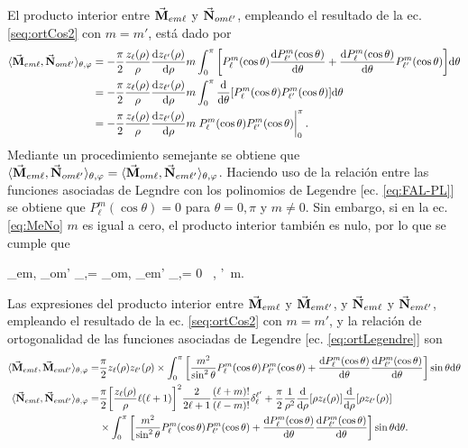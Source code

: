 \documentclass[letterpaper,11pt] {article}
\begin{document}
 El producto interior entre $\va{M}_{em\ell}$ y $\va{N}_{om\ell'}$, empleando el resultado de la ec. \eqref{seq:ortCos2} con $m=m'$, está dado por
	\begin{align}
		\langle\va{M}_{em\ell},  \va{N}_{om\ell'} \rangle_{\theta,\varphi} &= - \frac{\pi}{2} \frac{z_\ell (\rho)}{\rho}\dv{z_{\ell'}(\rho)}{\rho}	m
							 \int_0^\pi\qty[P_\ell^m(\cos \theta )\dv{P_{\ell'}^m(\cos \theta )}{\theta}+ 
							  \dv{P_{\ell}^m(\cos \theta )}{\theta}P_{\ell'}^m(\cos \theta )] \dd\theta \notag\\
					 &=- \frac{\pi}{2} \frac{z_\ell (\rho)}{\rho}\dv{z_{\ell'}(\rho)}{\rho}	m 
					 	\int_0^\pi \dv{\theta}\qty[P_\ell^m(\cos\theta)P_{\ell'}^m(\cos\theta)]\dd\theta \notag\\
					 &=- \frac{\pi}{2} \frac{z_\ell (\rho)}{\rho}\dv{z_{\ell'}(\rho)}{\rho}	m \eval{P_\ell^m(\cos\theta)P_{\ell'}^m(\cos\theta)}_0^\pi.
					 	\label{eq:MeNo}
	\end{align}
Mediante un procedimiento semejante se obtiene que $\langle\va{M}_{em\ell},  \va{N}_{om\ell'} \rangle_{\theta,\varphi}=\langle\va{M}_{om\ell},  \va{N}_{em\ell'} \rangle_{\theta,\varphi}$. Haciendo uso de la relación entre las funciones asociadas de Legndre con los polinomios de Legendre [ec. \eqref{eq:FAL-PL}] se obtiene que $P_\ell^m(\cos\theta)=0$ para $\theta=0,\pi$ y $m\neq 0$. Sin embargo, si en la ec. \eqref{eq:MeNo} $m$ es igual a cero, el producto interior también es nulo, por lo que se cumple que 
	\begin{tcolorbox}
		\langle{}_{em\ell},  _{om\ell'} \rangle_{\theta,\varphi}=
		\langle{}_{om\ell},  _{em\ell'} \rangle_{\theta,\varphi}= 0	
		\qquad \forall\, \ell, \ell'\, m.
	\end{tcolorbox}
Las expresiones del  producto interior entre $\va{M}_{em\ell}$ y $\va{M}_{em\ell'}$, y $\va{N}_{em\ell}$ y $\va{N}_{em\ell'}$, empleando el resultado de la ec. \eqref{seq:ortCos2} con $m=m'$, y la relación de ortogonalidad de las funciones asociadas de Legendre [ec. \eqref{eq:ortLegendre}] son
	\begin{align*}
		\langle\va{M}_{em\ell},  \va{M}_{em\ell'} \rangle_{\theta,\varphi} =& 
				\frac{\pi}{2} z_\ell (\rho) z_{\ell'}(\rho)\times	 \int_0^\pi\qty[\frac{m^2}{\sin^2\theta}P_\ell^m(\cos\theta)P_{\ell'}^m(\cos\theta)
				 +\dv{P_\ell^m(\cos\theta)}{\theta}\dv{P_{\ell'}^m(\cos\theta)}{\theta}]\sin\theta\dd\theta\\
		\langle\va{N}_{em\ell},  \va{N}_{em\ell'} \rangle_{\theta,\varphi} =&
				\frac{\pi}{2} \qty[\frac{z_\ell(\rho)}{\rho}\ell(\ell+1)]^2\frac{2}{2\ell+1}\frac{(\ell+m)!}{(\ell-m)!}\delta_\ell^{\ell'}+
				\frac{\pi}{2} \frac{1}{\rho^2}\dv{\rho}\qty[\rho z_\ell (\rho)]\dv{\rho}\qty[\rho z_{\ell'}(\rho)]\\
				&\times \int_0^\pi\qty[\frac{m^2}{\sin^2\theta}P_\ell^m(\cos\theta)P_{\ell'}^m(\cos\theta)
					+\dv{P_\ell^m(\cos\theta)}{\theta}\dv{P_{\ell'}^m(\cos\theta)}{\theta}]\sin\theta\dd\theta.				 
	\end{align*}
\end{document}
